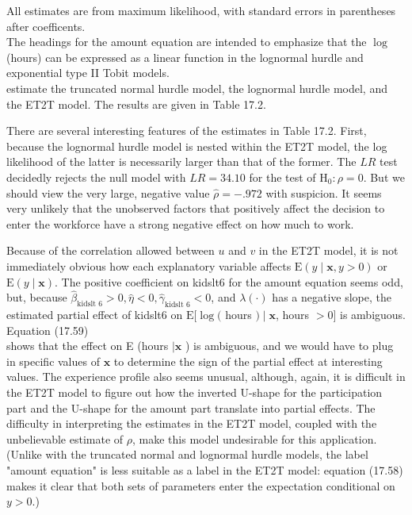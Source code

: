 \documentclass[10pt]{article}
\begin{document}
All estimates are from maximum likelihood, with standard errors in parentheses after coefficents.\\
The headings for the amount equation are intended to emphasize that the $\log$ (hours) can be expressed as a linear function in the lognormal hurdle and exponential type II Tobit models.\\
estimate the truncated normal hurdle model, the lognormal hurdle model, and the ET2T model. The results are given in Table 17.2.

There are several interesting features of the estimates in Table 17.2. First, because the lognormal hurdle model is nested within the ET2T model, the log likelihood of the latter is necessarily larger than that of the former. The $L R$ test decidedly rejects the null model with $L R=34.10$ for the test of $\mathrm{H}_{0}: \rho=0$. But we should view the very large, negative value $\hat{\rho}=-.972$ with suspicion. It seems very unlikely that the unobserved factors that positively affect the decision to enter the workforce have a strong negative effect on how much to work.

Because of the correlation allowed between $u$ and $v$ in the ET2T model, it is not immediately obvious how each explanatory variable affects $\mathrm{E}(y \mid \mathbf{x}, y>0)$ or $\mathrm{E}(y \mid \mathbf{x})$. The positive coefficient on kidslt6 for the amount equation seems odd, but, because $\hat{\beta}_{\text {kidslt } 6}>0, \hat{\eta}<0, \hat{\gamma}_{\text {kidslt } 6}<0$, and $\lambda(\cdot)$ has a negative slope, the estimated partial effect of kidslt6 on $\mathrm{E}[\log ($ hours $) \mid \mathbf{x}$, hours $>0]$ is ambiguous. Equation (17.59)\\
shows that the effect on E (hours $\mid \mathbf{x}$ ) is ambiguous, and we would have to plug in specific values of $\mathbf{x}$ to determine the sign of the partial effect at interesting values. The experience profile also seems unusual, although, again, it is difficult in the ET2T model to figure out how the inverted U-shape for the participation part and the U-shape for the amount part translate into partial effects. The difficulty in interpreting the estimates in the ET2T model, coupled with the unbelievable estimate of $\rho$, make this model undesirable for this application. (Unlike with the truncated normal and lognormal hurdle models, the label "amount equation" is less suitable as a label in the ET2T model: equation (17.58) makes it clear that both sets of parameters enter the expectation conditional on $y>0$.)
\end{document}
